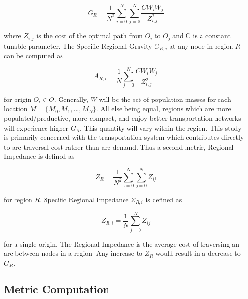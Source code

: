 \begin{equation}
	G_{R} = \frac{1}{N^2}\sum_{i = 0}^{N} \sum_{j = 0 }^{N} \frac{CW_iW_j}{Z_{i,j}^2} \label{eq:regional_gravity}
\end{equation}

\noindent where $Z_{i,j}$ is the cost of the optimal path from $O_i$ to $O_j$ and C is a constant tunable parameter. The Specific Regional Gravity $G_{R,i}$ at any node in region $R$ can be computed as

\begin{equation}
	A_{R,i} = \frac{1}{N}\sum_{j = 0 }^{N} \frac{CW_iW_j}{Z_{i,j}^2} \label{eq:specific_regional_accessibility}
\end{equation}

for origin $O_i \in O$. Generally, $W$ will be the set of population masses for each location $M = \{M_0, M_1, \dots, M_N\}$. All else being equal, regions which are more populated/productive, more compact, and enjoy better transportation networks will experience higher $G_R$. This quantity will vary within the region. This study is primarily concerned with the transportation system which contributes directly to arc traversal cost rather than arc demand. Thus a second metric, Regional Impedance is defined as

\begin{equation}
	Z_{R} = \frac{1}{N^2}\sum_{i = 0}^{N} \sum_{j = 0 }^{N} Z_{ij} \label{eq:regional_impedance}
\end{equation}

for region $R$. Specific Regional Impedance $Z_{R,i}$ is defined as

\begin{equation}
	Z_{R,i} = \frac{1}{N}\sum_{j = 0 }^{N} Z_{ij} \label{eq:specific_regional_impedance}
\end{equation}

for a single origin. The Regional Impedance is the average cost of traversing an arc between nodes in a region. Any increase to $Z_R$ would result in a decrease to $G_R$.

\subsection*{Metric Computation}

